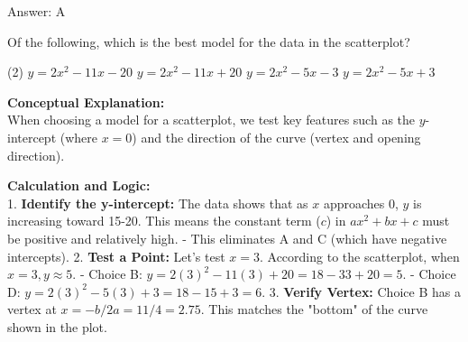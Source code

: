 \documentclass[11pt,paper=a4,answers]{exam}
\begin{document}
\begin{questions}
\begin{solution}
\vspace{30pt}

Answer: \colorbox{yellow!100}{A}
\end{solution}

\vspace{60pt}

\question
\begin{center}
\end{center}
Of the following, which is the best model for the data in the scatterplot?
\begin{tasks}(2)
    \task $y = 2x^2 - 11x - 20$
    \task $y = 2x^2 - 11x + 20$
    \task $y = 2x^2 - 5x - 3$
    \task $y = 2x^2 - 5x + 3$
\end{tasks}

\begin{solution}
\textbf{Conceptual Explanation:} \\
When choosing a model for a scatterplot, we test key features such as the $y$-intercept (where $x=0$) and the direction of the curve (vertex and opening direction).

\vspace{30pt}

\textbf{Calculation and Logic:} \\
1. \textbf{Identify the y-intercept:} The data shows that as $x$ approaches 0, $y$ is increasing toward 15-20. This means the constant term ($c$) in $ax^2 + bx + c$ must be positive and relatively high. 
   - This eliminates A and C (which have negative intercepts).
2. \textbf{Test a Point:} Let's test $x = 3$. According to the scatterplot, when $x = 3, y \approx 5$.
   - Choice B: $y = 2(3)^2 - 11(3) + 20 = 18 - 33 + 20 = 5$.
   - Choice D: $y = 2(3)^2 - 5(3) + 3 = 18 - 15 + 3 = 6$.
3. \textbf{Verify Vertex:} Choice B has a vertex at $x = -b/2a = 11/4 = 2.75$. This matches the "bottom" of the curve shown in the plot.

\vspace{30pt}


\end{solution}
\end{questions}
\end{document}
